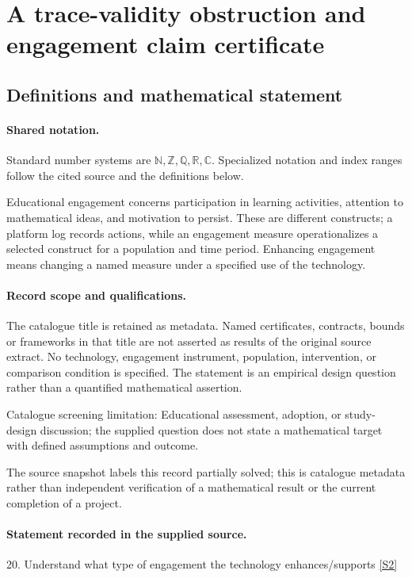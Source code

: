 \documentclass[11pt]{article}
\newcommand{\sref}[2]{\hyperlink{source:#1:#2}{[S#2]}}
\begin{document}
\section{A trace-validity obstruction and engagement claim certificate}\label{statement}

\subsection{Definitions and mathematical statement}

\paragraph{Shared notation.}Standard number systems are $\mathbb N,\mathbb Z,\mathbb Q,\mathbb R,\mathbb C$. Specialized notation and index ranges follow the cited source and the definitions below.


Educational engagement concerns participation in learning activities, attention to mathematical ideas, and motivation to persist. These are different constructs; a platform log records actions, while an engagement measure operationalizes a selected construct for a population and time period. Enhancing engagement means changing a named measure under a specified use of the technology.
\paragraph{Record scope and qualifications.}
The catalogue title is retained as metadata. Named certificates, contracts, bounds or frameworks in that title are not asserted as results of the original source extract.
No technology, engagement instrument, population, intervention, or comparison condition is specified. The statement is an empirical design question rather than a quantified mathematical assertion.

Catalogue screening limitation: Educational assessment, adoption, or study-design discussion; the supplied question does not state a mathematical target with defined assumptions and outcome.

The source snapshot labels this record partially solved; this is catalogue metadata rather than independent verification of a mathematical result or the current completion of a project.
\paragraph{Statement recorded in the supplied source.}
20. Understand what type of engagement the technology enhances/supports \sref{statement}{2}
\end{document}
